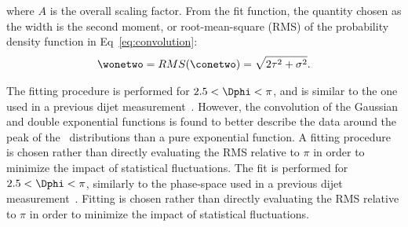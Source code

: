 where $A$ is the overall scaling factor. From the fit function, the quantity chosen as the width is the second moment, or root-mean-square (RMS) of the probability density function in Eq~\ref{eq:convolution}: 
\begin{eqnarray}
\wonetwo = RMS(\conetwo) =  \sqrt{2\tau^2 + \sigma^{2}}.
\end{eqnarray}

The fitting procedure is performed for $2.5<\Dphi<\pi$, and is similar to the one used in a previous dijet  measurement~\cite{Chatrchyan:2014hqa}. However, the convolution of the Gaussian and double exponential functions is found to better describe the data around the peak of the \conetwo\ distributions than a pure exponential function. A fitting procedure is chosen rather than directly evaluating the RMS relative to $\pi$ in order to minimize the impact of statistical fluctuations.
The fit is performed for $2.5<\Dphi<\pi$, similarly to the phase-space used in a previous dijet measurement~\cite{Chatrchyan:2014hqa}. Fitting is chosen rather than directly evaluating the RMS relative to $\pi$ in order to minimize the impact of statistical fluctuations.  






\FloatBarrier
